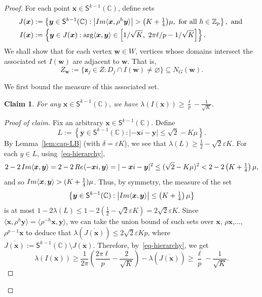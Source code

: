 \documentclass[11pt, a4paper]{article}
\newcommand\innerp[1]{\langle #1 \rangle}
\newenvironment{poc}{\begin{proof}[Proof of claim]\renewcommand*{\qedsymbol}{$\blacksquare$}}{\end{proof}}
\newcommand{\V}[1]{\mathbold{#1}}
\newtheorem{claim}[theorem]{Claim}
\theoremstyle{definition}
\def\eps{{\varepsilon}}
\newcommand{\iminnerp}[1]{{\rm{Im}}\langle #1 \rangle}
\newcommand{\reinnerp}[1]{{\rm{Re}}\langle #1 \rangle}
\newcommand{\sS}{\mathsf{S}}
\newcommand{\sC}{\mathbb{C}}
\newcommand{\sZ}{\mathbb{Z}}
\newcommand*{\bigabs}[1]{\bigl|#1\bigr|}
\begin{document}
\begin{proof}
For each point $\V{x}\in \sS^{k-1}(\sC)$, define sets
\begin{align*}
	J(\V{x})&:=\left\{\V{y}\in \sS^{k-1}(\sC): \bigabs{\iminnerp{\V{x}, \rho^h \V{y}}}>\textstyle{\left(K+\frac{1}{4}\right)}\mu, \text{ for all } h\in \sZ_p\right\},\text{ and }\\
	I(\V{x})&:=\left\{\V{y}\in J(\V{x}): \arg\innerp{\V{x},\V{y}}\in \left[1/\sqrt{K},~2\pi \ell/p-1/\sqrt{K}\right]\right\}.
\end{align*} 
We shall show that for each vertex $\V w\in W$, vertices whose domains intersect the associated set $I(\V w)$ are adjacent to $\V w$. That is, 
\begin{equation}\label{eq:Zw}
	Z_\V{w}:=\{\V{z}_j\in Z: D_j\cap I(\V{w})\neq \varnothing\}\subseteq N_G(\V w).
\end{equation}

We first bound the measure of this associated set.
\begin{claim}\label{lem-crossnbrs}
	For any $\V{x}\in \sS^{k-1}(\sC)$, we have $\lambda(I(\V{x}))\ge \frac{\ell}{p}-\frac{1}{\sqrt{K}}$.
\end{claim}
\begin{poc}
	Fix an arbitrary $\V{x}\in \sS^{k-1}(\sC)$. Define 
	$$L:=\left\{\V{y}\in \sS^{k-1}(\sC): |-\V{x}i-\V{y}|\le\sqrt{2}-K\mu\right\}.$$
	By Lemma~\ref{lem:cap-LB} (with $\delta=\eps K$), we see that $\lambda(L)\ge \frac{1}{2}-\sqrt{2}\eps K$. For each $y\in L$, using~\eqref{eq-hierarchy},
	\begin{equation*}
		2- 2\,\iminnerp{\V{x},\V{y}}=2-2\,\reinnerp{-\V{x}i,\V{y}}=|- \V{x}i-\V{y}|^2\le (\sqrt{2}-K\mu)^2<2-2\left(K+\tfrac{1}{4}\right)\mu,
	\end{equation*}
    and so  $\iminnerp{\V{x},\V{y}}>(K+\frac{1}{4})\mu$. Thus, by symmetry, the measure of the set
	$$
	\left\{\V{y}\in \sS^{k-1}(\sC): \bigabs{\iminnerp{\V{x},\V{y}}}\le\left(K+\tfrac{1}{4}\right)\mu\right\}$$
	is at most $1-2\lambda(L)\le 1-2\left(\frac{1}{2}-\sqrt{2}\eps K\right)=2\sqrt{2}\eps K$.
	Since $\innerp{\V{x},\rho^h\V{y}}=\innerp{\rho^{-h}\V{x},\V{y}}$, we can take the union bound of such sets over $\V{x}$, $\rho\V{x}$,$\ldots$, $\rho^{p-1}\V{x}$ to deduce that $\lambda(\overline{J(\V{x})})\le 2\sqrt{2}\eps Kp$, where $\overline{J(\V{x})}:=\sS^{k-1}(\sC)\setminus J(\V{x})$. Therefore, by~\eqref{eq-hierarchy}, we get
	\begin{equation*}
		\lambda(I(\V{x}))\ge\frac{1}{2\pi}\left(\frac{2\pi\ell}{p}-\frac{2}{\sqrt{K}}\right)-\lambda(\overline{J(\V{x})})\ge \frac{\ell}{p}-\frac{1}{\sqrt{K}}.
	\end{equation*}
\end{poc}



\end{proof}
\end{document}
